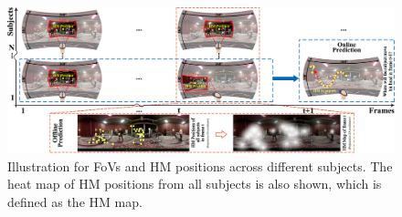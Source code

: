 \documentclass[10pt,journal,compsoc]{IEEEtran}
\begin{document}
\begin{figure}
	\begin{center}
		\centerline{\includegraphics[width=1.6\columnwidth]{figures/introduction/fig_one}}
        \vspace{-.5em}
		\caption{\footnotesize{Illustration for FoVs and HM positions across different subjects. The heat map of HM positions from all subjects is also shown, which is defined as the HM map.}}
		\label{fig-one}
	\end{center}
\vspace{-2em}
\end{figure}
\end{document}

